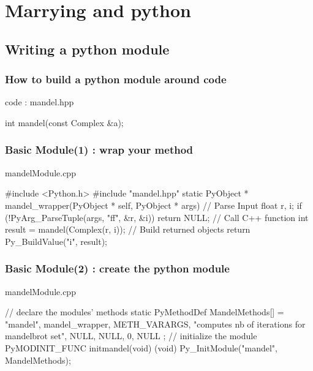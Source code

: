 \section[python]{Marrying \cpp and python}

\subsection[module]{Writing a python module}

\begin{frame}[fragile]
  \frametitle{How to build a python module around \cpp code}
  \begin{block}{\cpp code : mandel.hpp}
    \begin{cppcode*}{}
      int mandel(const Complex &a);
    \end{cppcode*}
  \end{block}
\end{frame}
  
\begin{frame}[fragile]
  \frametitle{Basic Module(1) : wrap your method}
  \begin{block}{mandelModule.cpp}
    \begin{cppcode*}{}
      #include <Python.h>
      #include "mandel.hpp"
      static PyObject * mandel_wrapper(PyObject * self,
                                       PyObject * args) {
        // Parse Input
        float r, i;
        if (!PyArg_ParseTuple(args, "ff", &r, &i))
          return NULL;
        // Call C++ function
        int result = mandel(Complex(r, i));
        // Build returned objects
        return Py_BuildValue("i", result);
      }
    \end{cppcode*}
  \end{block}
\end{frame}

\begin{frame}[fragile]
  \frametitle{Basic Module(2) : create the python module}
  \begin{block}{mandelModule.cpp}
    \begin{cppcode*}{}
      // declare the modules' methods
      static PyMethodDef MandelMethods[] = {
          {"mandel", mandel_wrapper, METH_VARARGS,
          "computes nb of iterations for mandelbrot set"},
          {NULL, NULL, 0, NULL}
      };
      // initialize the module
      PyMODINIT_FUNC initmandel(void) {
        (void) Py_InitModule("mandel", MandelMethods);
      }
    \end{cppcode*}
  \end{block}
\end{frame}

